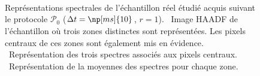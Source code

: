 \begin{figure}
    \centering
    \\
    \\
    \\
    \caption{\protect\label{fig-lr-real-data-spectra}
        Représentations spectrales de l'échantillon réel étudié acquis suivant le protocole $\mathcal{P}_0$ ($\Delta t=\np[ms]{10}$, $r = 1$).
        ~Image HAADF de l'échantillon où trois zones distinctes sont représentées. Les pixels centraux de ces zones sont également mis en évidence.
        ~Représentation des trois spectres associés aux pixels centraux.
        ~Représentation de la moyennes des spectres pour chaque zone.
    }
\end{figure}

